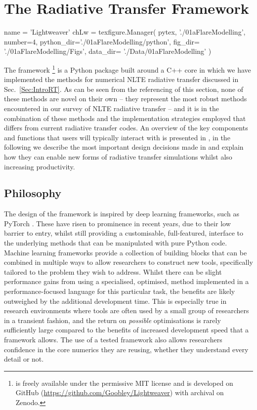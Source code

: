 \chapter{The \Lw{} Radiative Transfer Framework}
\begin{pycode}[Lw]
name = 'Lightweaver'
chLw = texfigure.Manager(
    pytex,
    './01aFlareModelling',
    number=4,
    python_dir='./01aFlareModelling/python',
    fig_dir=   './01aFlareModelling/Figs',
    data_dir=  './Data/01aFlareModelling'
)
\end{pycode}


The \Lw{} framework \citep{Osborne2021, LightweaverZenodo}\footnote{\Lw{} is freely available under the permissive MIT license and is developed on GitHub (\url{https://github.com/Goobley/Lightweaver}) with archival on Zenodo.} is a Python package built around a C++ core in which we have implemented the methods for numerical NLTE radiative transfer discussed in Sec.~\ref{Sec:IntroRT}.
As can be seen from the referencing of this section, none of these methods are novel on their own -- they represent the most robust methods encountered in our survey of NLTE radiative transfer -- and it is in the combination of these methods and the implementation strategies employed that \Lw{} differs from current \Sota{} radiative transfer codes.
An overview of the key components and functions that users will typically interact with is presented in \citet{Osborne2021}, in the following we describe the most important design decisions made in \Lw{} and explain how they can enable new forms of radiative transfer simulations whilst also increasing productivity.

\section{Philosophy}

The design of the \Lw{} framework is inspired by deep learning frameworks, such as PyTorch \citep{PyTorch}.
These have risen to prominence in recent years, due to their low barrier to entry, whilst still providing a customisable, full-featured, interface to the underlying methods that can be manipulated with pure Python code.
Machine learning frameworks provide a collection of building blocks that can be combined in multiple ways to allow researchers to construct new tools, specifically tailored to the problem they wish to address.
Whilst there can be slight performance gains from using a specialised, optimised, \Sota{} method implemented in a performance-focused language for this particular task, the benefits are likely outweighed by the additional development time.
This is especially true in research environments where tools are often used by a small group of researchers in a transient fashion, and the return on \emph{possible} optimisations is rarely sufficiently large compared to the benefits of increased development speed that a framework allows.
The use of a tested framework also allows researchers confidence in the core numerics they are reusing, whether they understand every detail or not.


